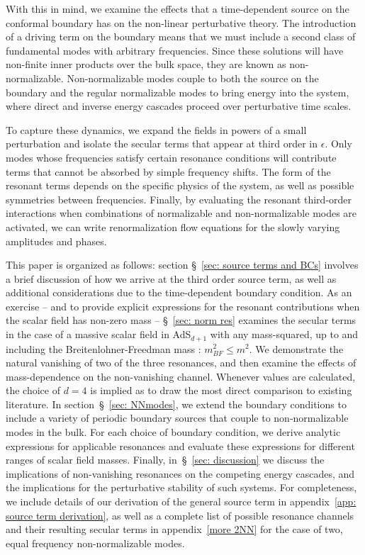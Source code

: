 \documentclass[../PhD.tex]{subfiles}
\begin{document}
With this in mind, we examine the effects that a time-dependent source on the conformal boundary has on the non-linear perturbative theory. The introduction of a driving term on the boundary means that we must include a second class of fundamental modes with arbitrary frequencies. Since these solutions will have non-finite inner products over the bulk space, they are known as non-normalizable. Non-normalizable modes couple to both the source on the boundary and the regular normalizable modes to bring energy into the system, where direct and inverse energy cascades proceed over perturbative time scales.

To capture these dynamics, we expand the fields in powers of a small perturbation and isolate the secular terms that appear at third order in $\epsilon$. Only modes whose frequencies satisfy certain resonance conditions will contribute terms that cannot be absorbed by simple frequency shifts. The form of the resonant terms depends on the specific physics of the system, as well as possible symmetries between frequencies. Finally, by evaluating the resonant third-order interactions when combinations of normalizable and non-normalizable modes are activated, we can write renormalization flow equations for the slowly varying amplitudes and phases.

This paper is organized as follows: section \S\!~\ref{sec: source terms and BCs} involves a brief discussion of how we arrive at the third order source term, as well as additional considerations due to the time-dependent boundary condition. As an exercise -- and to provide explicit expressions for the resonant contributions when the scalar field has non-zero mass -- \S\!~\ref{sec: norm res} examines the secular terms in the case of a massive scalar field in AdS$_{d+1}$ with any mass-squared, up to and including the Breitenlohner-Freedman mass \cite{Breitenlohner:1982bm}: $m^2_{BF} \leq m^2$. We demonstrate the natural vanishing of two of the three resonances, and then examine the effects of mass-dependence on the non-vanishing channel. Whenever values are calculated, the choice of $d=4$ is implied as to draw the most direct comparison to existing literature. In section~\S\!~\ref{sec: NNmodes}, we extend the boundary conditions to include a variety of periodic boundary sources that couple to non-normalizable modes in the bulk. For each choice of boundary condition, we derive analytic expressions for applicable resonances and evaluate these expressions for different ranges of scalar field masses. Finally, in~\S\!~\ref{sec: discussion} we discuss the implications of non-vanishing resonances on the competing energy cascades, and the implications for the perturbative stability of such systems. For completeness, we include details of our derivation of the general source term in appendix~\ref{app: source term derivation}, as well as a complete list of possible resonance channels and their resulting secular terms in appendix~\ref{more 2NN} for the case of two, equal frequency non-normalizable modes.
\end{document}

